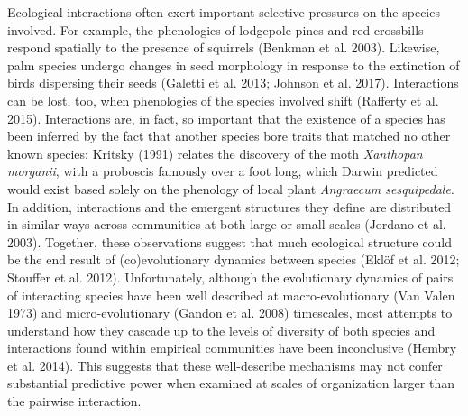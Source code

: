 \documentclass[12pt]{article}
\begin{document}

Ecological interactions often exert important selective pressures on the
species involved. For example, the phenologies of lodgepole pines and
red crossbills respond spatially to the presence of squirrels (Benkman
et al. 2003). Likewise, palm species undergo changes in seed morphology
in response to the extinction of birds dispersing their seeds (Galetti
et al. 2013; Johnson et al. 2017). Interactions can be lost, too, when
phenologies of the species involved shift (Rafferty et al. 2015).
Interactions are, in fact, so important that the existence of a species
has been inferred by the fact that another species bore traits that
matched no other known species: Kritsky (1991) relates the discovery of
the moth \emph{Xanthopan morganii}, with a proboscis famously over a
foot long, which Darwin predicted would exist based solely on the
phenology of local plant \emph{Angraecum sesquipedale}. In addition,
interactions and the emergent structures they define are distributed in
similar ways across communities at both large or small scales (Jordano
et al. 2003). Together, these observations suggest that much ecological
structure could be the end result of (co)evolutionary dynamics between
species (Eklöf et al. 2012; Stouffer et al. 2012). Unfortunately,
although the evolutionary dynamics of pairs of interacting species have
been well described at macro-evolutionary (Van Valen 1973) and
micro-evolutionary (Gandon et al. 2008) timescales, most attempts to
understand how they cascade up to the levels of diversity of both
species and interactions found within empirical communities have been
inconclusive (Hembry et al. 2014). This suggests that these
well-describe mechanisms may not confer substantial predictive power
when examined at scales of organization larger than the pairwise
interaction.
\end{document}
